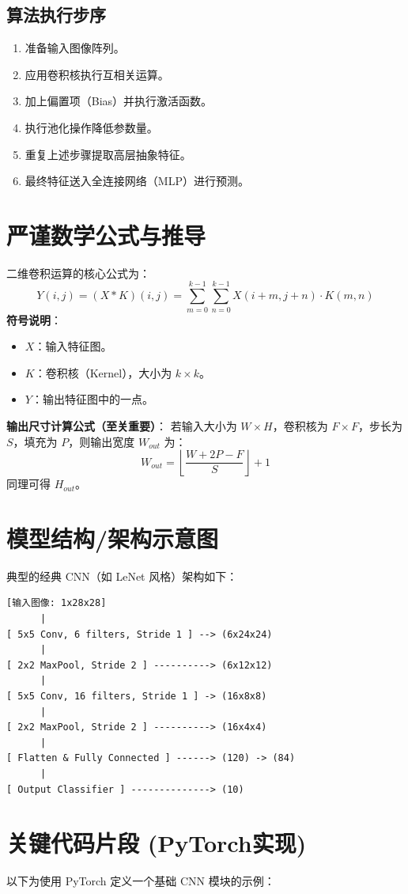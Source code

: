 \documentclass[12pt, a4paper]{article}
\begin{document}
\subsection{算法执行步序}
\begin{enumerate}
    \item 准备输入图像阵列。
    \item 应用卷积核执行互相关运算。
    \item 加上偏置项（Bias）并执行激活函数。
    \item 执行池化操作降低参数量。
    \item 重复上述步骤提取高层抽象特征。
    \item 最终特征送入全连接网络（MLP）进行预测。
\end{enumerate}

\section{严谨数学公式与推导}
二维卷积运算的核心公式为：
$$
Y(i,j) = (X * K)(i,j) = \sum_{m=0}^{k-1} \sum_{n=0}^{k-1} X(i+m, j+n) \cdot K(m,n)
$$
\textbf{符号说明}：
\begin{itemize}
    \item $X$：输入特征图。
    \item $K$：卷积核（Kernel），大小为 $k \times k$。
    \item $Y$：输出特征图中的一点。
\end{itemize}

\textbf{输出尺寸计算公式（至关重要）}：
若输入大小为 $W \times H$，卷积核为 $F \times F$，步长为 $S$，填充为 $P$，则输出宽度 $W_{out}$ 为：
$$
W_{out} = \left\lfloor \frac{W + 2P - F}{S} \right\rfloor + 1
$$
同理可得 $H_{out}$。

\section{模型结构/架构示意图}
典型的经典 CNN（如 LeNet 风格）架构如下：
\begin{verbatim}
[输入图像: 1x28x28]
      |
[ 5x5 Conv, 6 filters, Stride 1 ] --> (6x24x24)
      |
[ 2x2 MaxPool, Stride 2 ] ----------> (6x12x12)
      |
[ 5x5 Conv, 16 filters, Stride 1 ] -> (16x8x8)
      |
[ 2x2 MaxPool, Stride 2 ] ----------> (16x4x4)
      |
[ Flatten & Fully Connected ] ------> (120) -> (84)
      |
[ Output Classifier ] --------------> (10)
\end{verbatim}

\section{关键代码片段 (PyTorch实现)}
以下为使用 PyTorch 定义一个基础 CNN 模块的示例：
\end{document}
